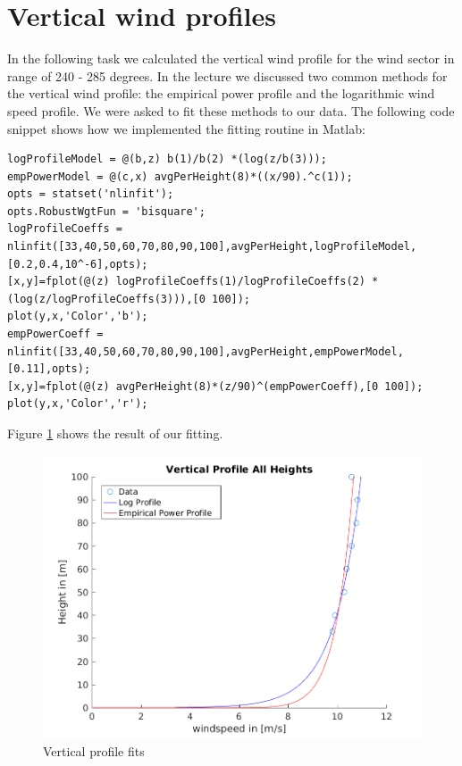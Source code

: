\documentclass[10pt]{article}
\begin{document}
\section{Vertical wind profiles}
In the following task we calculated the vertical wind profile for the wind sector in range of 240 - 285 degrees. In the lecture we discussed two common methods for the vertical wind profile: the empirical power profile and the logarithmic wind speed profile. We were asked to fit these methods to our data. The following code snippet shows how we implemented the fitting routine in Matlab:

\begin{lstlisting}
logProfileModel = @(b,z) b(1)/b(2) *(log(z/b(3)));
empPowerModel = @(c,x) avgPerHeight(8)*((x/90).^c(1));
opts = statset('nlinfit');
opts.RobustWgtFun = 'bisquare';
logProfileCoeffs = nlinfit([33,40,50,60,70,80,90,100],avgPerHeight,logProfileModel,[0.2,0.4,10^-6],opts);
[x,y]=fplot(@(z) logProfileCoeffs(1)/logProfileCoeffs(2) *(log(z/logProfileCoeffs(3))),[0 100]);
plot(y,x,'Color','b');
empPowerCoeff = nlinfit([33,40,50,60,70,80,90,100],avgPerHeight,empPowerModel,[0.11],opts);
[x,y]=fplot(@(z) avgPerHeight(8)*(z/90)^(empPowerCoeff),[0 100]);
plot(y,x,'Color','r');
\end{lstlisting}

Figure \ref{fig:verticalfit} shows the result of our fitting.

\begin{figure}[H]
\centering
\includegraphics[width=1\linewidth]{../figures/verticalProfileFits.png}
\caption{Vertical profile fits}
\label{fig:verticalfit}
\end{figure}
\end{document}
